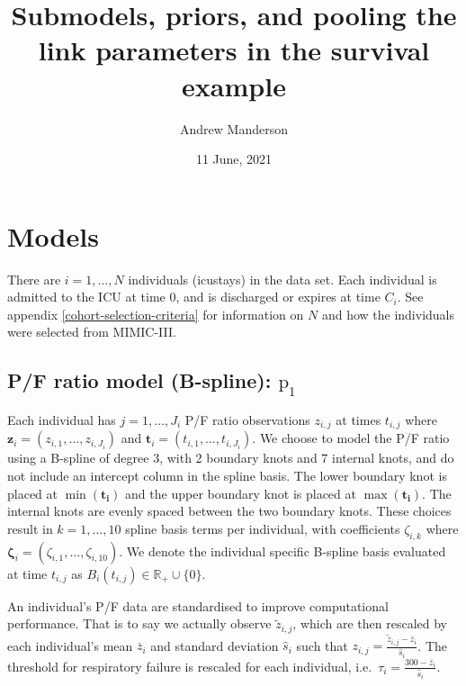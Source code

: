 \documentclass[
  10pt,
  a4paper,
]{article}
\title{Submodels, priors, and pooling the link parameters in the
survival example}
\author{Andrew Manderson}
\date{11 June, 2021}
\newcommand{\pd}{\text{p}}
\begin{document}
\maketitle

\hypertarget{models}{%
\section{Models}\label{models}}

There are \(i = 1, \ldots, N\) individuals (icustays) in the data set.
Each individual is admitted to the ICU at time \(0\), and is discharged
or expires at time \(C_{i}\). See appendix
\ref{cohort-selection-criteria} for information on \(N\) and how the
individuals were selected from MIMIC-III.

\hypertarget{pf-ratio-model-b-spline-pd_1}{%
\subsection{\texorpdfstring{P/F ratio model (B-spline):
\(\pd_{1}\)}{P/F ratio model (B-spline): \textbackslash pd\_\{1\}}}\label{pf-ratio-model-b-spline-pd_1}}

Each individual has \(j = 1, \ldots, J_{i}\) P/F ratio observations
\(z_{i, j}\) at times \(t_{i, j}\) where
\(\boldsymbol{z}_{i} = (z_{i, 1}, \ldots, z_{i, J_{i}})\) and
\(\boldsymbol{t}_{i} = (t_{i, 1}, \ldots, t_{i, J_{i}})\). We choose to
model the P/F ratio using a B-spline of degree 3, with 2 boundary knots
and 7 internal knots, and do not include an intercept column in the
spline basis. The lower boundary knot is placed at
\(\min(\boldsymbol{t_{i}})\) and the upper boundary knot is placed at
\(\max(\boldsymbol{t_{i}})\). The internal knots are evenly spaced
between the two boundary knots. These choices result in
\(k = 1, \ldots, 10\) spline basis terms per individual, with
coefficients \(\zeta_{i, k}\) where
\(\boldsymbol{\zeta}_{i} = (\zeta_{i, 1}, \ldots, \zeta_{i, 10})\). We
denote the individual specific B-spline basis evaluated at time
\(t_{i, j}\) as \(B_{i}(t_{i, j}) \in \mathbb{R}_{+} \cup \{0\}\).

An individual's P/F data are standardised to improve computational
performance. That is to say we actually observe \(\tilde{z}_{i, j}\),
which are then rescaled by each individual's mean \(\overline{z}_{i}\)
and standard deviation \(\hat{s}_{i}\) such that
\(z_{i, j} = \frac{\tilde{z}_{i, j} - \overline{z}_{i}}{\hat{s}_{i}}\).
The threshold for respiratory failure is rescaled for each individual,
i.e.~\(\tau_{i} = \frac{300 - \overline{z}_{i}}{\hat{s}_{i}}\).
\end{document}

